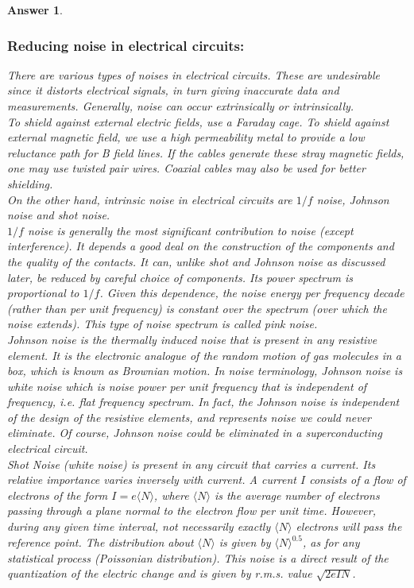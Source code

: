\documentclass[a4paper]{article}
\newtheorem{ans}{Answer}[subsection]
\theoremstyle{new}
\begin{document}
\begin{ans}\leavevmode
\subsubsection*{Reducing noise in electrical circuits:}
There are various types of noises in electrical circuits. These are undesirable since it distorts electrical signals, in turn giving inaccurate data and measurements. Generally, noise can occur extrinsically or intrinsically.\\[5pt]
To shield against external electric fields, use a Faraday cage. To shield against external magnetic field, we use a high permeability metal to provide a low reluctance path for B field lines. If the cables generate these stray magnetic fields, one may use twisted pair wires. Coaxial cables may also be used for better shielding.\\[5pt]
On the other hand, intrinsic noise in electrical circuits are $1/f$ noise, Johnson noise and shot noise.\\[5pt]
$1/f$ noise is generally the most significant contribution to noise (except interference). It depends a good deal on the construction of the components and the quality of the contacts. It can, unlike shot and Johnson noise as discussed later, be reduced by careful choice of components. Its power spectrum is proportional to $1/f$. Given this dependence, the noise energy per frequency decade (rather than per unit frequency) is constant over the spectrum (over which the noise extends). This type of noise spectrum is called pink noise.\\[5pt]
Johnson noise is the thermally induced noise that is present in any resistive element. It is the electronic analogue of the random motion of gas molecules in a box, which is known as Brownian motion. In noise terminology, Johnson noise is white noise which is noise power per unit frequency that is independent of frequency, i.e. flat frequency spectrum. In fact, the Johnson noise is independent of the design of the resistive elements, and represents noise we could never eliminate. Of course, Johnson noise could be eliminated in a superconducting electrical circuit.\\[5pt]
Shot Noise (white noise) is present in any circuit that carries a current. Its relative importance varies inversely with current. A current $I$ consists of a flow of electrons of the form $I=e\langle N\rangle$, where $\langle N\rangle$ is the average number of electrons passing through a plane normal to the electron flow per unit time. However, during any given time interval, not necessarily exactly $\langle N\rangle$ electrons will pass the reference point. The distribution about $\langle N\rangle$ is given by $\langle N\rangle^{0.5}$, as for any statistical process (Poissonian distribution). This noise is a direct result of the quantization of the electric change and is given by r.m.s. value $\sqrt{2eIN}$. 

\end{ans}
\end{document}
